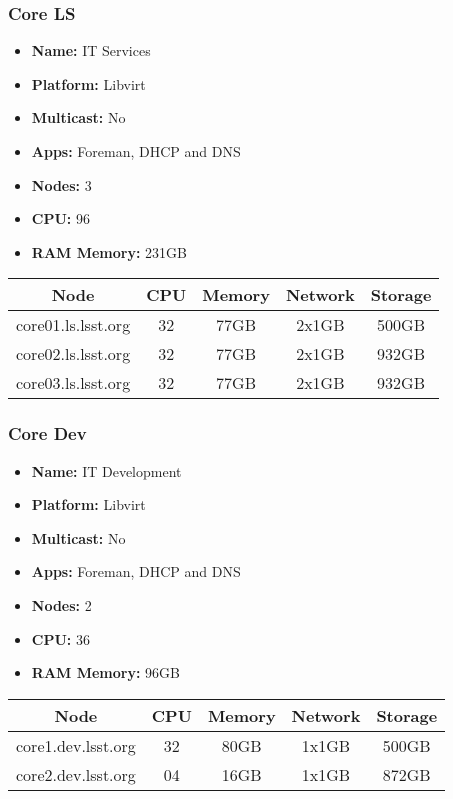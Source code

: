\subsubsection{Core LS}
\begin{itemize}
  \itemsep0em 
  \item \textbf{Name:}      IT Services
  \item \textbf{Platform:}        Libvirt
  \item \textbf{Multicast:}  No
  \item \textbf{Apps:}       Foreman, DHCP and DNS
  \item \textbf{Nodes:}      3
  \item \textbf{CPU:}        96
  \item \textbf{RAM Memory:} 231GB
\end{itemize}
\begin{center}
  \small
  \begin{tabular}{||c c c c c||} 
    \hline
    \textbf{Node} & \textbf{CPU} & \textbf{Memory} & \textbf{Network} & \textbf{Storage} \\ [0.5ex]
    \hline
    core01.ls.lsst.org & 32 & 77GB & 2x1GB & 500GB \\
    \hline
    core02.ls.lsst.org & 32 & 77GB & 2x1GB & 932GB \\
    \hline
    core03.ls.lsst.org & 32 & 77GB & 2x1GB & 932GB \\
    \hline
  \end{tabular}
\end{center}

\subsubsection{Core Dev}
\begin{itemize}
  \itemsep0em 
  \item \textbf{Name:}       IT Development
  \item \textbf{Platform:}   Libvirt
  \item \textbf{Multicast:}  No
  \item \textbf{Apps:}       Foreman, DHCP and DNS
  \item \textbf{Nodes:}      2
  \item \textbf{CPU:}        36
  \item \textbf{RAM Memory:} 96GB
\end{itemize}
\begin{center}
  \small
  \begin{tabular}{||c c c c c||}
    \hline
    \textbf{Node} & \textbf{CPU} & \textbf{Memory} & \textbf{Network} & \textbf{Storage} \\ [0.5ex]
    \hline
    core1.dev.lsst.org & 32 & 80GB & 1x1GB & 500GB \\
    \hline
    core2.dev.lsst.org & 04 & 16GB & 1x1GB & 872GB \\
    \hline
  \end{tabular}
\end{center}

